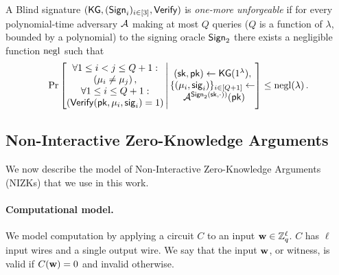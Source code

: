 \begin{definition} \label{def:bs-unforgeability}
    A Blind signature $(\mathsf{KG},\allowbreak (\mathsf{Sign}_i)_{i\in [3]},\allowbreak \mathsf{Verify})$ is \emph{one-more unforgeable} if for every polynomial-time adversary $\mathcal{A}$ making at most $Q$ queries ($Q$ is a function of $\lambda$, bounded by a polynomial) to the signing oracle $\mathsf{Sign}_2$ there exists a negligible function $\mathrm{negl}$ such that \[
    \Pr\left[ \begin{matrix} \forall 1 \leq i < j \leq Q+1 : \\ \left( \mu_i \neq \mu_j \right) , \\
        \forall 1 \leq i \leq Q+1 : \\ \left( \mathsf{Verify}(\mathsf{pk}, \mu_i, \mathsf{sig}_i) = 1 \right)\\
    \end{matrix}  \, \middle| \, \begin{matrix}
        (\mathsf{sk},\mathsf{pk}) \gets \mathsf{KG}(1^\lambda), \\
        \{(\mu_i,\mathsf{sig}_i)\}_{i \in [Q+1]} \gets  \\
        \,\, \mathcal{A}^{\mathsf{Sign}_2(\mathsf{sk},\cdot))}(\mathsf{pk}) \\ 
    \end{matrix} \right] \leq \mathrm{negl}(\lambda) \, .
    \]
\end{definition} 



\subsection{Non-Interactive Zero-Knowledge Arguments}\label{subsec:nizk}
We now describe the model of Non-Interactive Zero-Knowledge Arguments (NIZKs) that we use in this work.

\paragraph{Computational model.}
We model computation by applying a circuit  $C$ to an input $\mathbf{w}\in \mathbb{Z}_q^{\ell}$. $C$ has $\ell$ input wires and a single output wire. We say that the input $\mathbf{w}$, or witness, is valid if $C(\mathbf{w})=0$ and invalid otherwise.


